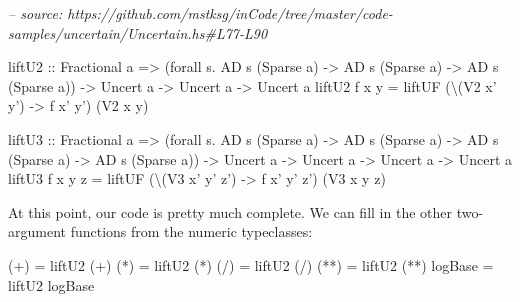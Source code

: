 \documentclass[]{article}
\newenvironment{Shaded}{}{}
\newcommand{\CommentTok}[1]{\textcolor[rgb]{0.38,0.63,0.69}{\textit{#1}}}
\newcommand{\DataTypeTok}[1]{\textcolor[rgb]{0.56,0.13,0.00}{#1}}
\newcommand{\FunctionTok}[1]{\textcolor[rgb]{0.02,0.16,0.49}{#1}}
\newcommand{\NormalTok}[1]{#1}
\newcommand{\OtherTok}[1]{\textcolor[rgb]{0.00,0.44,0.13}{#1}}
\begin{document}
\begin{Shaded}
\begin{Highlighting}[]
\CommentTok{-- source: https://github.com/mstksg/inCode/tree/master/code-samples/uncertain/Uncertain.hs#L77-L90}

\OtherTok{liftU2 ::} \DataTypeTok{Fractional}\NormalTok{ a}
       \OtherTok{=>}\NormalTok{ (forall s}\FunctionTok{.} \DataTypeTok{AD}\NormalTok{ s (}\DataTypeTok{Sparse}\NormalTok{ a) }\OtherTok{->} \DataTypeTok{AD}\NormalTok{ s (}\DataTypeTok{Sparse}\NormalTok{ a) }\OtherTok{->} \DataTypeTok{AD}\NormalTok{ s (}\DataTypeTok{Sparse}\NormalTok{ a))}
       \OtherTok{->} \DataTypeTok{Uncert}\NormalTok{ a}
       \OtherTok{->} \DataTypeTok{Uncert}\NormalTok{ a}
       \OtherTok{->} \DataTypeTok{Uncert}\NormalTok{ a}
\NormalTok{liftU2 f x y }\FunctionTok{=}\NormalTok{ liftUF (\textbackslash{}(}\DataTypeTok{V2}\NormalTok{ x' y') }\OtherTok{->}\NormalTok{ f x' y') (}\DataTypeTok{V2}\NormalTok{ x y)}

\OtherTok{liftU3 ::} \DataTypeTok{Fractional}\NormalTok{ a}
       \OtherTok{=>}\NormalTok{ (forall s}\FunctionTok{.} \DataTypeTok{AD}\NormalTok{ s (}\DataTypeTok{Sparse}\NormalTok{ a) }\OtherTok{->} \DataTypeTok{AD}\NormalTok{ s (}\DataTypeTok{Sparse}\NormalTok{ a) }\OtherTok{->} \DataTypeTok{AD}\NormalTok{ s (}\DataTypeTok{Sparse}\NormalTok{ a) }\OtherTok{->} \DataTypeTok{AD}\NormalTok{ s (}\DataTypeTok{Sparse}\NormalTok{ a))}
       \OtherTok{->} \DataTypeTok{Uncert}\NormalTok{ a}
       \OtherTok{->} \DataTypeTok{Uncert}\NormalTok{ a}
       \OtherTok{->} \DataTypeTok{Uncert}\NormalTok{ a}
       \OtherTok{->} \DataTypeTok{Uncert}\NormalTok{ a}
\NormalTok{liftU3 f x y z }\FunctionTok{=}\NormalTok{ liftUF (\textbackslash{}(}\DataTypeTok{V3}\NormalTok{ x' y' z') }\OtherTok{->}\NormalTok{ f x' y' z') (}\DataTypeTok{V3}\NormalTok{ x y z)}
\end{Highlighting}
\end{Shaded}

At this point, our code is pretty much complete. We can fill in the other
two-argument functions from the numeric typeclasses:

\begin{Shaded}
\begin{Highlighting}[]
\NormalTok{(}\FunctionTok{+}\NormalTok{)     }\FunctionTok{=}\NormalTok{ liftU2 (}\FunctionTok{+}\NormalTok{)}
\NormalTok{(}\FunctionTok{*}\NormalTok{)     }\FunctionTok{=}\NormalTok{ liftU2 (}\FunctionTok{*}\NormalTok{)}
\NormalTok{(}\FunctionTok{/}\NormalTok{)     }\FunctionTok{=}\NormalTok{ liftU2 (}\FunctionTok{/}\NormalTok{)}
\NormalTok{(}\FunctionTok{**}\NormalTok{)    }\FunctionTok{=}\NormalTok{ liftU2 (}\FunctionTok{**}\NormalTok{)}
\NormalTok{logBase }\FunctionTok{=}\NormalTok{ liftU2 logBase}
\end{Highlighting}
\end{Shaded}
\end{document}
